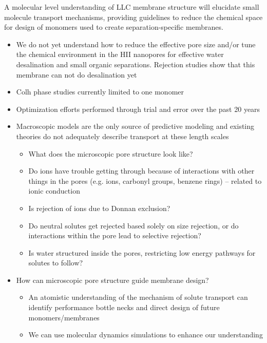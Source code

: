 \documentclass{article}
\begin{document}
	A molecular level understanding of LLC membrane structure will elucidate small molecule transport mechanisms, providing guidelines to reduce the chemical space for design of monomers used to create separation-specific membranes.
	\begin{itemize}
                \item We do not yet understand how to reduce the effective pore size and/or tune the chemical environment in the HII nanopores for effective water desalination and small organic separations. Rejection studies show that this membrane can not do desalination yet
		\item Colh phase studies currently limited to one monomer
                \item Optimization efforts performed through trial and error over the past 20 years
                \item Macroscopic models are the only source of predictive modeling and existing theories do not adequately describe transport at these length scales
                \begin{itemize}
                        \item What does the microscopic pore structure look like?
			\item Do ions have trouble getting through because of interactions with other things in the pores (e.g. ions, carbonyl groups, benzene rings) -- related to ionic conduction
			\item Is rejection of ions due to Donnan exclusion?
                        \item Do neutral solutes get rejected based solely on size rejection, or do interactions within the pore lead to selective rejection?
                        \item Is water structured inside the pores, restricting low energy pathways for solutes to follow? 
		\end{itemize}
		\item How can microscopic pore structure guide membrane design?
                  \begin{itemize}
		\item An atomistic understanding of the mechanism of solute transport can identify performance bottle necks and direct design of future monomers/membranes
		\item We can use molecular dynamics simulations to enhance our understanding 
                  \end{itemize}
	\end{itemize}
	 
\end{document}
